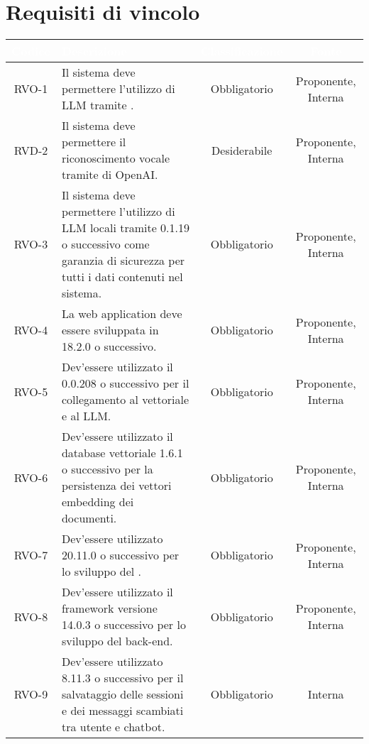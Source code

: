 \section{Requisiti di vincolo}

\begingroup
\setlength{\tabcolsep}{10pt}
\renewcommand{\arraystretch}{1.5}
\begin{xltabular}{\textwidth}{| c | X | c | c |}
    \hline
     \textbf{\textcolor{white}{Codice}} & \textbf{\textcolor{white}{Descrizione}} & \textbf{\textcolor{white}{Classificazione}} & \textbf{\textcolor{white}{Fonte}}\\
    \hline
    \endhead
   
    RVO-1 & Il sistema deve permettere l'utilizzo di LLM tramite . & Obbligatorio & Proponente, Interna \\
    \hline
    RVD-2 & Il sistema deve permettere il riconoscimento vocale tramite  di OpenAI. & Desiderabile & Proponente, Interna \\
    \hline
    RVO-3 & Il sistema deve permettere l'utilizzo di LLM locali tramite  0.1.19 o successivo come garanzia di sicurezza per tutti i dati contenuti nel sistema. & Obbligatorio & Proponente, Interna \\
    \hline
    RVO-4 & La web application deve essere sviluppata in  18.2.0 o successivo. & Obbligatorio & Proponente, Interna \\
    \hline
    RVO-5 & Dev'essere utilizzato il   0.0.208 o successivo per il collegamento al  vettoriale e al LLM. & Obbligatorio & Proponente, Interna \\
    \hline
    RVO-6 & Dev'essere utilizzato il database vettoriale  1.6.1 o successivo per la persistenza dei vettori embedding dei documenti. & Obbligatorio & Proponente, Interna \\
    \hline
    RVO-7 & Dev'essere utilizzato  20.11.0 o successivo per lo sviluppo del . & Obbligatorio & Proponente, Interna \\
    \hline
    RVO-8 & Dev'essere utilizzato il framework  versione 14.0.3 o successivo per lo sviluppo del back-end. & Obbligatorio & Proponente, Interna \\
    \hline
    RVO-9 & Dev'essere utilizzato  8.11.3 o successivo per il salvataggio delle sessioni e dei messaggi scambiati tra utente e chatbot. & Obbligatorio & Interna \\

\end{xltabular}
